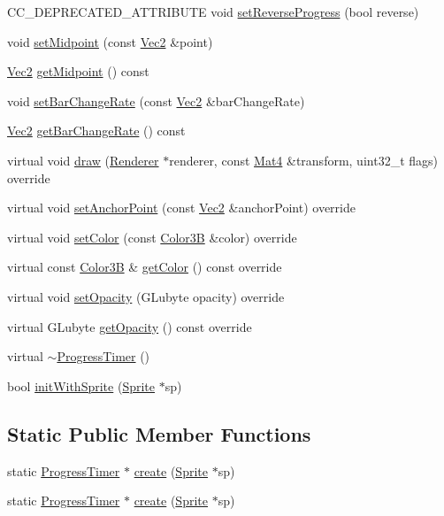 \begin{DoxyCompactItemize}
\item 
C\+C\+\_\+\+D\+E\+P\+R\+E\+C\+A\+T\+E\+D\+\_\+\+A\+T\+T\+R\+I\+B\+U\+TE void \hyperlink{classProgressTimer_ac97bd260d1f006c29c20a5d741a7e11b}{set\+Reverse\+Progress} (bool reverse)
\item 
void \hyperlink{classProgressTimer_a69680f76df01ea815970964cc1dc673b}{set\+Midpoint} (const \hyperlink{classVec2}{Vec2} \&point)
\item 
\hyperlink{classVec2}{Vec2} \hyperlink{classProgressTimer_a3b680cbc620a22d766aea62b518ef66f}{get\+Midpoint} () const
\item 
void \hyperlink{classProgressTimer_ac54f707a0291274c04e265b2898586d6}{set\+Bar\+Change\+Rate} (const \hyperlink{classVec2}{Vec2} \&bar\+Change\+Rate)
\item 
\hyperlink{classVec2}{Vec2} \hyperlink{classProgressTimer_a0f3e761df2dca3294dab8e553e19adfa}{get\+Bar\+Change\+Rate} () const
\item 
virtual void \hyperlink{classProgressTimer_a93e4e885d40db09173bea0a7cf19addb}{draw} (\hyperlink{classRenderer}{Renderer} $\ast$renderer, const \hyperlink{classMat4}{Mat4} \&transform, uint32\+\_\+t flags) override
\item 
virtual void \hyperlink{classProgressTimer_a9f177a39d3158dd2f48f6558db5dcd02}{set\+Anchor\+Point} (const \hyperlink{classVec2}{Vec2} \&anchor\+Point) override
\item 
virtual void \hyperlink{classProgressTimer_a3cd315f15a68b541ab276648fa5803cf}{set\+Color} (const \hyperlink{structColor3B}{Color3B} \&color) override
\item 
virtual const \hyperlink{structColor3B}{Color3B} \& \hyperlink{classProgressTimer_ad8ca5deb560d078fcd576c896981b5c2}{get\+Color} () const override
\item 
virtual void \hyperlink{classProgressTimer_a757eb314cc8f4633c6e5e240b2e6a4e8}{set\+Opacity} (G\+Lubyte opacity) override
\item 
virtual G\+Lubyte \hyperlink{classProgressTimer_ab65270de82c7f02e733ce017830c2409}{get\+Opacity} () const override
\item 
virtual \hyperlink{classProgressTimer_ae5b642ead8174fcbc4d5684fceb86a55}{$\sim$\+Progress\+Timer} ()
\item 
bool \hyperlink{classProgressTimer_afa1640086b67814db77d3ae725c18b45}{init\+With\+Sprite} (\hyperlink{classSprite}{Sprite} $\ast$sp)
\end{DoxyCompactItemize}
\subsection*{Static Public Member Functions}
\begin{DoxyCompactItemize}
\item 
static \hyperlink{classProgressTimer}{Progress\+Timer} $\ast$ \hyperlink{classProgressTimer_a04df0bb71ad5378f3d70abcb8ceb0123}{create} (\hyperlink{classSprite}{Sprite} $\ast$sp)
\item 
static \hyperlink{classProgressTimer}{Progress\+Timer} $\ast$ \hyperlink{classProgressTimer_ae4b5741da712802b7f09859b21e0f69f}{create} (\hyperlink{classSprite}{Sprite} $\ast$sp)
\end{DoxyCompactItemize}
